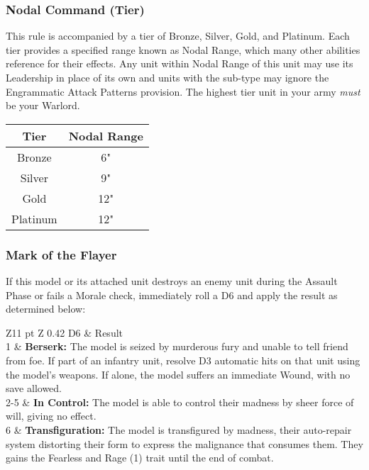 \begin{multicols}{2}
\subsubsection{Nodal Command (Tier)} \label{Nodal Command}

This rule is accompanied by a tier of Bronze, Silver, Gold, and Platinum. Each tier provides a specified range known as Nodal Range, which many other abilities reference for their effects. Any unit within Nodal Range of this unit may use its Leadership in place of its own and units with the  sub-type may ignore the Engrammatic Attack Patterns provision. The highest tier unit in your army \textit{must} be your Warlord.

\label{Nodal Range}
\begin{tabular}{|c|c|}
	\hline
	Tier & Nodal Range \\
	\hline
	Bronze & 6" \\
	Silver & 9" \\
	Gold & 12" \\
	Platinum & 12" \\
	\hline
\end{tabular}

\subsubsection{Mark of the Flayer} \label{Mark of the Flayer}

If this model or its attached unit destroys an enemy unit during the Assault Phase or fails a Morale check, immediately roll a D6 and apply the result as determined below: \\
\begin{tabular}{Z{11 pt} Z {0.42\textwidth}}
	D6 & Result \\
	1 & \textbf{Berserk:} The model is seized by murderous fury and unable to tell friend from foe. If part of an infantry unit, resolve D3 automatic hits on that unit using the model's weapons. If alone, the model suffers an immediate Wound, with no save allowed. \\
	2-5 & \textbf{In Control:} The model is able to control their madness by sheer force of will, giving no effect. \\
	6 & \textbf{Transfiguration:} The model is transfigured by madness, their auto-repair system distorting their form to express the malignance that consumes them. They gains the Fearless and Rage (1) trait until the end of combat. \\
\end{tabular}



\end{multicols}
